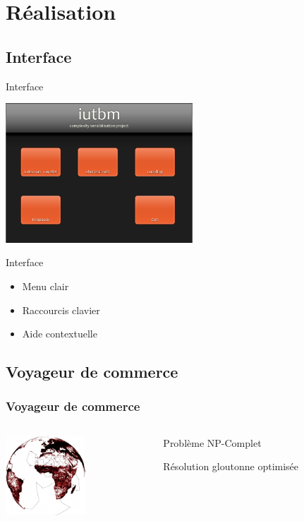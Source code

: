 \documentclass[xcolor=dvipsnames]{beamer}
\begin{document}
\section{Réalisation}
    \subsection{Interface}
        \begin{frame}{Interface}
	  \begin{center}
            \includegraphics[width=7cm]{images/interface.png}
	  \end{center}
	 
        \end{frame}
 \begin{frame}{Interface}
            \begin{itemize}
	            \item Menu clair
	            \item Raccourcis clavier
	            \item Aide contextuelle
            \end{itemize}
        \end{frame}
    \subsection{Voyageur de commerce}
    \begin{frame}
        \frametitle{Voyageur de commerce}
        \begin{columns}
            \begin{column}{0cm}
                \includegraphics[width=3cm]{images/wts.jpg}
            \end{column}
            \begin{column}{8cm}
                \begin{description}\itemsep15pt
                    \item Problème NP-Complet
                    \item Résolution gloutonne optimisée
                \end{description}
            \end{column}
        \end{columns}
    \end{frame}
\end{document}
